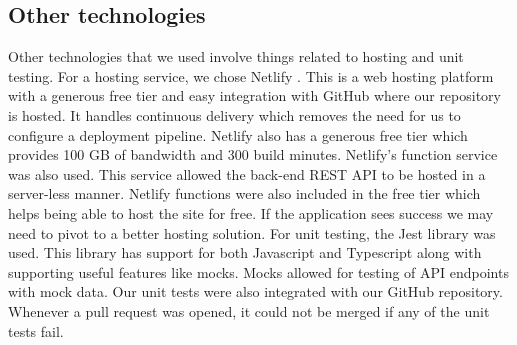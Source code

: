 \documentclass{article}
\begin{document}
\subsection{Other technologies}
\quad Other technologies that we used involve things related to hosting and unit testing. For a hosting service, we chose Netlify \cite{Netlify}. This is a web hosting platform with a generous free tier and easy integration with GitHub where our repository is hosted. It handles continuous delivery which removes the need for us to configure a deployment pipeline. Netlify also has a generous free tier which provides 100 GB of bandwidth and 300 build minutes. Netlify's function service \cite{Netlify_functions} was also used. This service allowed the back-end REST API to be hosted in a server-less manner. Netlify functions were also included in the free tier which helps being able to host the site for free. If the application sees success we may need to pivot to a better hosting solution. For unit testing, the Jest library was used. This library has support for both Javascript and Typescript along with supporting useful features like mocks. Mocks allowed for testing of API endpoints with mock data. Our unit tests were also integrated with our GitHub repository. Whenever a pull request was opened, it could not be merged if any of the unit tests fail. 

\end{document}
